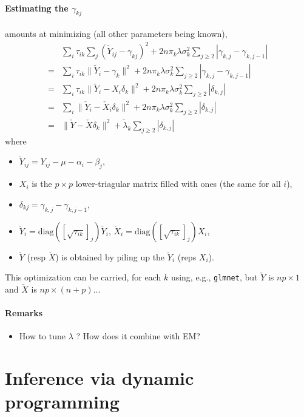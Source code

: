 \documentclass[a4paper, 11pt]{article}
\newcommand{\lambdat}{\widetilde{\lambda}}
\newcommand{\Xc}{\check{X}}
\newcommand{\Yc}{\check{Y}}
\newcommand{\Yt}{\widetilde{Y}}
\begin{document}
\paragraph{Estimating the $\gamma_{kj}$} amounts at minimizing (all other parameters being known),
\begin{align*}
 & \sum_i \tau_{ik} \sum_j (\Yt_{ij} -\gamma_{kj})^2  + 2 n \pi_k \lambda \sigma_k^2 \sum_{j\geq 2} |\gamma_{k,j} - \gamma_{k, j-1}| \\
 = & \sum_i \tau_{ik} \|\Yt_i -\gamma_k\|^2  + 2 n \pi_k \lambda \sigma_k^2 \sum_{j\geq 2} |\gamma_{k,j} - \gamma_{k, j-1}| \\
 = & \sum_i \tau_{ik} \|\Yt_i - X_i \delta_k\|^2  + 2 n \pi_k \lambda \sigma_k^2 \sum_{j\geq 2} |\delta_{k,j}| \\
 = & \sum_i \|\Yc_i - \Xc_i \delta_k\|^2  + 2 n \pi_k \lambda \sigma_k^2 \sum_{j\geq 2} |\delta_{k,j}| \\ 
 = & \|\Yc - \Xc \delta_k\|^2  + \lambdat_k \sum_{j\geq 2} |\delta_{k,j}| 
\end{align*}
where 
\begin{itemize}
 \item $\Yt_{ij} = Y_{ij} - \mu - \alpha_i - \beta_j$,
 \item $X_i$ is the $p \times p$ lower-triagular matrix filled with ones (the same for all $i$), 
 \item $\delta_{kj} = \gamma_{k,j} - \gamma_{k, j-1}$, 
 \item $\Yc_i = \text{diag}([\sqrt{\tau_{ik}}]_j) \Yt_i$, $\Xc_i = \text{diag}([\sqrt{\tau_{ik}}]_j) X_i$,
 \item $\Yc$ (resp $\Xc$) is obtained by piling up the $\Yc_i$ (reps $X_i$).
\end{itemize}
This optimization can be carried, for each $k$ using, e.g., {\tt glmnet}, but $\Yc$ is $np \times 1$ and $\Xc$ is $np \times (n+p)$...

\paragraph{Remarks}
\begin{itemize}
 \item How to tune $\lambda$ ? How does it combine with EM?
\end{itemize}


\section{Inference via dynamic programming}
\end{document}
